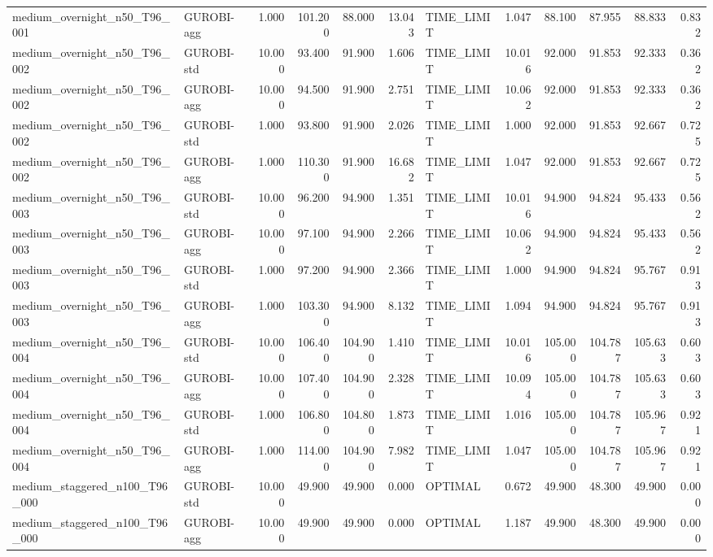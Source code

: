 \begin{table}[htbp]
\begin{tabular}{llrrrrlrrrrr}
medium\_overnight\_n50\_T96\_001 & GUROBI-agg & 1.000 & 101.200 & 88.000 & 13.043 & TIME\_LIMIT & 1.047 & 88.100 & 87.955 & 88.833 & 0.832 \\
medium\_overnight\_n50\_T96\_002 & GUROBI-std & 10.000 & 93.400 & 91.900 & 1.606 & TIME\_LIMIT & 10.016 & 92.000 & 91.853 & 92.333 & 0.362 \\
medium\_overnight\_n50\_T96\_002 & GUROBI-agg & 10.000 & 94.500 & 91.900 & 2.751 & TIME\_LIMIT & 10.062 & 92.000 & 91.853 & 92.333 & 0.362 \\
medium\_overnight\_n50\_T96\_002 & GUROBI-std & 1.000 & 93.800 & 91.900 & 2.026 & TIME\_LIMIT & 1.000 & 92.000 & 91.853 & 92.667 & 0.725 \\
medium\_overnight\_n50\_T96\_002 & GUROBI-agg & 1.000 & 110.300 & 91.900 & 16.682 & TIME\_LIMIT & 1.047 & 92.000 & 91.853 & 92.667 & 0.725 \\
medium\_overnight\_n50\_T96\_003 & GUROBI-std & 10.000 & 96.200 & 94.900 & 1.351 & TIME\_LIMIT & 10.016 & 94.900 & 94.824 & 95.433 & 0.562 \\
medium\_overnight\_n50\_T96\_003 & GUROBI-agg & 10.000 & 97.100 & 94.900 & 2.266 & TIME\_LIMIT & 10.062 & 94.900 & 94.824 & 95.433 & 0.562 \\
medium\_overnight\_n50\_T96\_003 & GUROBI-std & 1.000 & 97.200 & 94.900 & 2.366 & TIME\_LIMIT & 1.000 & 94.900 & 94.824 & 95.767 & 0.913 \\
medium\_overnight\_n50\_T96\_003 & GUROBI-agg & 1.000 & 103.300 & 94.900 & 8.132 & TIME\_LIMIT & 1.094 & 94.900 & 94.824 & 95.767 & 0.913 \\
medium\_overnight\_n50\_T96\_004 & GUROBI-std & 10.000 & 106.400 & 104.900 & 1.410 & TIME\_LIMIT & 10.016 & 105.000 & 104.787 & 105.633 & 0.603 \\
medium\_overnight\_n50\_T96\_004 & GUROBI-agg & 10.000 & 107.400 & 104.900 & 2.328 & TIME\_LIMIT & 10.094 & 105.000 & 104.787 & 105.633 & 0.603 \\
medium\_overnight\_n50\_T96\_004 & GUROBI-std & 1.000 & 106.800 & 104.800 & 1.873 & TIME\_LIMIT & 1.016 & 105.000 & 104.787 & 105.967 & 0.921 \\
medium\_overnight\_n50\_T96\_004 & GUROBI-agg & 1.000 & 114.000 & 104.900 & 7.982 & TIME\_LIMIT & 1.047 & 105.000 & 104.787 & 105.967 & 0.921 \\
medium\_staggered\_n100\_T96\_000 & GUROBI-std & 10.000 & 49.900 & 49.900 & 0.000 & OPTIMAL & 0.672 & 49.900 & 48.300 & 49.900 & 0.000 \\
medium\_staggered\_n100\_T96\_000 & GUROBI-agg & 10.000 & 49.900 & 49.900 & 0.000 & OPTIMAL & 1.187 & 49.900 & 48.300 & 49.900 & 0.000 \\

\end{tabular}
\end{table}
